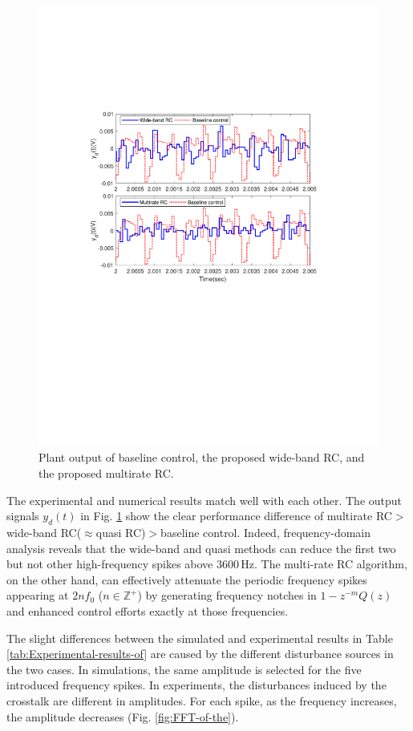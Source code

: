 \documentclass [11pt, proquest] {uwthesis}[2020/02/24]
\begin{document}
\begin{figure}[!ht]
\begin{centering}
\includegraphics[width=12cm]{Fractional-order-RC/Wideband_multi_time_exp}
\par\end{centering}
\caption{\label{fig:Yd(t)_wideband-exp}Plant output of baseline control, the proposed wide-band RC, and
the proposed multirate RC.}
\end{figure}
The experimental and numerical results match well with each other.
The output signals $y_{d}(t)$ in Fig. \ref{fig:Yd(t)_wideband-exp}
show the clear performance difference of multirate RC$>$wide-band
RC($\approx$quasi RC)$>$baseline control. Indeed, frequency-domain
analysis reveals that the wide-band and quasi methods can reduce the
first two but not other high-frequency spikes above $3600\,\text{Hz}$.
The multi-rate RC algorithm, on the other hand, can effectively attenuate
the periodic frequency spikes appearing at $2nf_{0}$ ($n\in\mathbb{Z}^{+}$)
by generating frequency notches in $1-z^{-m}Q(z)$ and enhanced control
efforts exactly at those frequencies.

The slight differences between the simulated and experimental results
in Table \ref{tab:Experimental-results-of} are caused by the different
disturbance sources in the two cases. In simulations, the same amplitude
is selected for the five introduced frequency spikes. In experiments,
the disturbances induced by the crosstalk are different in amplitudes.
For each spike, as the frequency increases, the amplitude decreases
(Fig. \ref{fig:FFT-of-the}).
\end{document}
